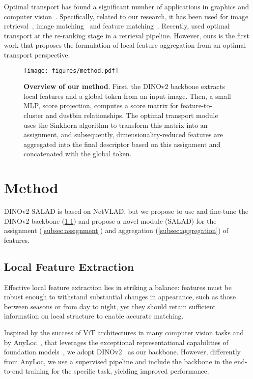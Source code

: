 \documentclass[10pt,twocolumn,letterpaper]{article}
\begin{document}
Optimal transport has found a significant number of applications in graphics and computer vision~\cite{bonneel2023survey}. Specifically, related to our research, it has been used for image retrieval~\cite{pele2009fast}, image matching~\cite{xing2022differentiable} and feature matching~\cite{sarlin2020superglue,sun2021loftr}. Recently, \citet{zhang2022beyond} used optimal transport at the re-ranking stage in a retrieval pipeline. However, ours is the first work that proposes the formulation of local feature aggregation from an optimal transport perspective.
 \begin{figure*}[t]
  \centering
   \texttt{[image: figures/method.pdf]}
   \caption{\textbf{Overview of our method}. First, the DINOv2 backbone extracts local features and a global token from an input image. Then, a small MLP, score projection, computes a score matrix for feature-to-cluster and dustbin relationships. The optimal transport module uses the Sinkhorn algorithm to transform this matrix into an assignment, and subsequently, dimensionality-reduced features are aggregated into the final descriptor based on this assignment and concatenated with the global token.}
   \label{fig:method}
\end{figure*}

\section{Method}
\label{sec:method}




DINOv2 SALAD is based on NetVLAD, but we propose to use and fine-tune the DINOv2 backbone (\cref{subsec:extraction}) and propose a novel module (SALAD) for the assignment (\cref{subsec:assignment}) and aggregation (\cref{subsec:aggregation}) of features.

\subsection{Local Feature Extraction}
\label{subsec:extraction}

Effective local feature extraction lies in striking a balance: features must be robust enough to withstand substantial changes in appearance, such as those between seasons or from day to night, yet they should retain sufficient information on local structure to enable accurate matching.

Inspired by the success of ViT architectures in many computer vision tasks and by AnyLoc~\cite{keetha2023anyloc}, that leverages the exceptional representational capabilities of foundation models~\cite{bommasani2021opportunities}, we adopt DINOv2~\cite{oquab2023dinov2} as our backbone. However, differently from AnyLoc, we use a supervised pipeline and include the backbone in the end-to-end training for the specific task, yielding improved performance.
\end{document}
